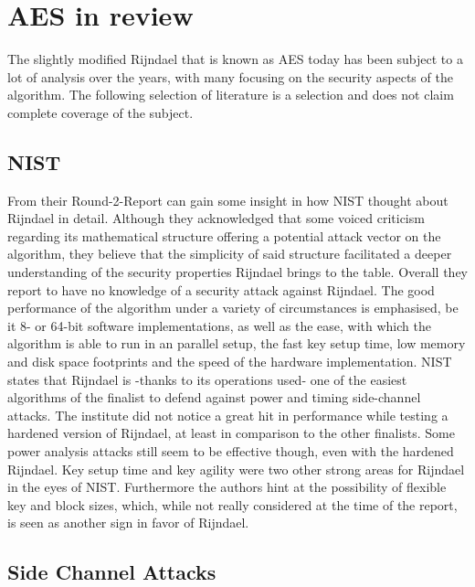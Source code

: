 \section{AES in review}
\label{ch:aes-review}

The slightly modified Rijndael that is known as \ac{AES} today has been subject to a lot of analysis over the years, with many focusing on the security aspects of the algorithm. The following selection of literature is a selection and does not claim complete coverage of the subject.

\subsection{NIST}
\label{ch:nist-review}

From their Round-2-Report \cite{round2report} can gain some insight in how \ac{NIST} thought about Rijndael in detail.
Although they acknowledged that some voiced criticism regarding its mathematical structure offering a potential attack vector on the algorithm, they believe that the simplicity of said structure facilitated a deeper understanding of the security properties Rijndael brings to the table. Overall they report to have no knowledge of a security attack against Rijndael.
The good performance of the algorithm under a variety of circumstances is emphasised, be it 8- or 64-bit software implementations, as well as the ease, with which the algorithm is able to run in an parallel setup, the fast key setup time, low memory and disk space footprints and the speed of the hardware implementation.
\ac{NIST} states that Rijndael is -thanks to its operations used- one of the easiest algorithms of the finalist to defend against power and timing side-channel attacks. The institute did not notice a great hit in performance while testing a hardened version of Rijndael, at least in comparison to the other finalists. Some power analysis attacks still seem to be effective though, even with the hardened Rijndael.
Key setup time and key agility were two other strong areas for Rijndael in the eyes of \ac{NIST}. Furthermore the authors hint at the possibility of flexible key and block sizes, which, while not really considered at the time of the report, is seen as another sign in favor of Rijndael.

\subsection{Side Channel Attacks}
\label{ch:sidechannelattacks}

